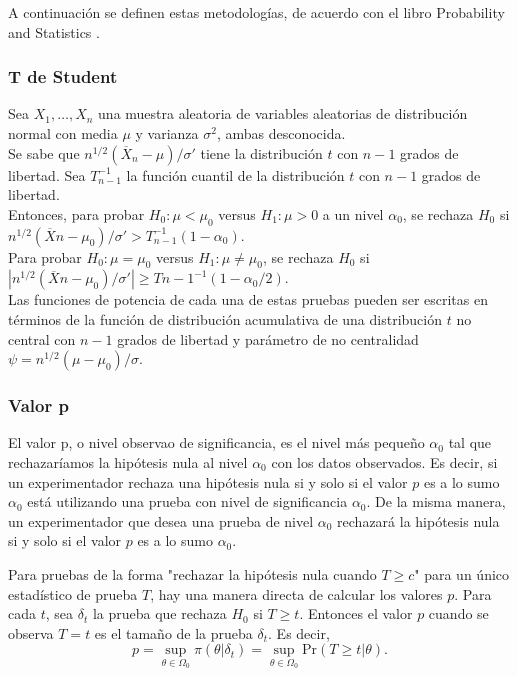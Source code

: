 \documentclass{book}
\begin{document}
A continuación se definen estas metodologías, de acuerdo con el libro Probability and Statistics \cite{degroot2012probability}.

\subsubsection{T de Student}
Sea $X_1, \ldots, X_n$ una muestra aleatoria de variables aleatorias de distribución normal con media $\mu$ y varianza $\sigma^2$, ambas desconocida. \\
Se sabe que $n^{1/2}(\overline{X}_n - \mu)/\sigma'$ tiene la distribución $t$ con $n - 1$ grados de libertad. Sea $T_{n-1}^{-1}$ la función cuantil de la distribución $t$ con $n - 1$ grados de libertad.\\
Entonces, para probar $H_0: \mu < \mu_0$ versus $H_1: \mu > 0$ a un nivel $\alpha_0$, se rechaza $H_0$ si $n^{1/2}(\overline{X}n - \mu_0)/\sigma' > T_{n-1}^{-1}(1 - \alpha_0)$. \\
Para probar $H_0: \mu = \mu_0$ versus $H_1: \mu \neq \mu_0$, se rechaza $H_0$ si $|n^{1/2}(\overline{X}n - \mu_0)/\sigma'| \geq T{n-1}^{-1}(1 - \alpha_0/2)$. \\
Las funciones de potencia de cada una de estas pruebas pueden ser escritas en términos de la función de distribución acumulativa de una distribución $t$ no central con $n - 1$ grados de libertad y parámetro de no centralidad $\psi = n^{1/2}(\mu - \mu_0)/\sigma$.

\subsubsection{Valor p}
El valor p, o nivel observao de significancia, es el nivel más pequeño $\alpha_0$ tal que rechazaríamos la hipótesis nula al nivel $\alpha_0$ con los datos observados. Es decir, si un experimentador rechaza una hipótesis nula si y solo si el valor $p$ es a lo sumo $\alpha_0$ está utilizando una prueba con nivel de significancia $\alpha_0$. De la misma manera, un experimentador que desea una prueba de nivel $\alpha_0$ rechazará la hipótesis nula si y solo si el valor $p$ es a lo sumo $\alpha_0$.

Para pruebas de la forma "rechazar la hipótesis nula cuando $T \geq c$" para un único estadístico de prueba $T$, hay una manera directa de calcular los valores $p$. 
Para cada $t$, sea $\delta_t$ la prueba que rechaza $H_0$ si $T \geq t$. Entonces el valor $p$ cuando se observa $T = t$ es el tamaño de la prueba $\delta_t$.
Es decir,
\begin{equation}
p = \sup_{\theta \in \Omega_0} \pi(\theta|\delta_t) = \sup_{\theta \in \Omega_0} \text{Pr}(T \geq t|\theta).
\end{equation}
\end{document}
